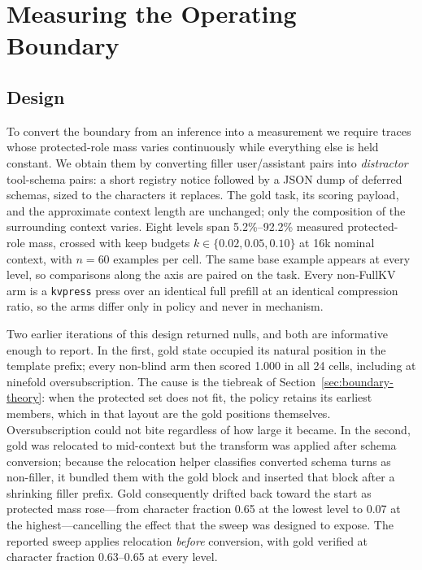 \section{Measuring the Operating Boundary}
\label{sec:sweep}

\subsection{Design}
\label{sec:sweep-design}

To convert the boundary from an inference into a measurement we require traces
whose protected-role mass varies continuously while everything else is held
constant.  We obtain them by converting filler user/assistant pairs into
\emph{distractor} tool-schema pairs: a short registry notice followed by a JSON
dump of deferred schemas, sized to the characters it replaces.  The gold task,
its scoring payload, and the approximate context length are unchanged; only the
composition of the surrounding context varies.  Eight levels span 5.2\%--92.2\%
measured protected-role mass, crossed with keep budgets
$k\in\{0.02,0.05,0.10\}$ at 16k nominal context, with $n=60$ examples per cell.
The same base example appears at every level, so comparisons along the axis are
paired on the task.  Every non-FullKV arm is a \texttt{kvpress} press over an
identical full prefill at an identical compression ratio, so the arms differ
only in policy and never in mechanism.

Two earlier iterations of this design returned nulls, and both are informative
enough to report.  In the first, gold state occupied its natural position in the
template prefix; every non-blind arm then scored 1.000 in all 24 cells,
including at ninefold oversubscription.  The cause is the tiebreak of
Section~\ref{sec:boundary-theory}: when the protected set does not fit, the
policy retains its earliest members, which in that layout are the gold positions
themselves.  Oversubscription could not bite regardless of how large it became.
In the second, gold was relocated to mid-context but the transform was applied
after schema conversion; because the relocation helper classifies converted
schema turns as non-filler, it bundled them with the gold block and inserted
that block after a shrinking filler prefix.  Gold consequently drifted back
toward the start as protected mass rose---from character fraction 0.65 at the
lowest level to 0.07 at the highest---cancelling the effect that the sweep was
designed to expose.  The reported sweep applies relocation \emph{before}
conversion, with gold verified at character fraction 0.63--0.65 at every level.

